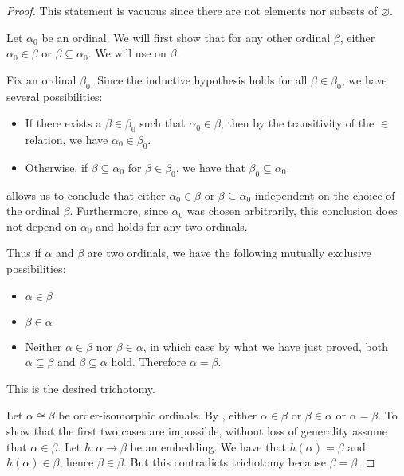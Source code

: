 \begin{proof}
   This statement is vacuous since there are not elements nor subsets of \( \varnothing \).

   Let \( \alpha_0 \) be an ordinal. We will first show that for any other ordinal \( \beta \), either \( \alpha_0 \in \beta \) or \( \beta \subseteq \alpha_0 \). We will use  on \( \beta \).

  Fix an ordinal \( \beta_0 \). Since the inductive hypothesis holds for all \( \beta \in \beta_0 \), we have several possibilities:
  \begin{itemize}
    \item If there exists a \( \beta \in \beta_0 \) such that \( \alpha_0 \in \beta \), then by the transitivity of the \( \in \) relation, we have \( \alpha_0 \in \beta_0 \).
    \item Otherwise, if \( \beta \subseteq \alpha_0 \) for \( \beta \in \beta_0 \), we have that \( \beta_0 \subseteq \alpha_0 \).
  \end{itemize}

   allows us to conclude that either \( \alpha_0 \in \beta \) or \( \beta \subseteq \alpha_0 \) independent on the choice of the ordinal \( \beta \). Furthermore, since \( \alpha_0 \) was chosen arbitrarily, this conclusion does not depend on \( \alpha_0 \) and holds for any two ordinals.

  Thus if \( \alpha \) and \( \beta \) are two ordinals, we have the following mutually exclusive possibilities:
  \begin{itemize}
    \item \( \alpha \in \beta \)
    \item \( \beta \in \alpha \)
    \item Neither \( \alpha \in \beta \) nor \( \beta \in \alpha \), in which case by what we have just proved, both \( \alpha \subseteq \beta \) and \( \beta \subseteq \alpha \) hold. Therefore \( \alpha = \beta \).
  \end{itemize}

  This is the desired trichotomy.

   Let \( \alpha \cong \beta \) be order-isomorphic ordinals. By , either \( \alpha \in \beta \) or \( \beta \in \alpha \) or \( \alpha = \beta \). To show that the first two cases are impossible, without loss of generality assume that \( \alpha \in \beta \). Let \( h: \alpha \to \beta \) be an embedding. We have that \( h(\alpha) = \beta \) and \( h(\alpha) \in \beta \), hence \( \beta \in \beta \). But this contradicts trichotomy because \( \beta = \beta \).


\end{proof}
